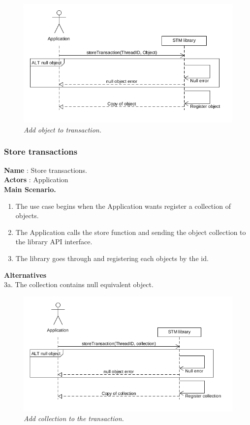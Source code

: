 \documentclass[12pt]{article}
\begin{document}
{\begin{figure}[h!]
\centering
\includegraphics[scale=0.5]{Pictures/store.png}
\caption{\textit{\color{gray}Add object to transaction.}}
\end{figure}

\subsubsection{Store transactions}
\textbf{Name} : Store transactions.\\
\textbf{Actors} : Application\\
\textbf{Main Scenario.}
\begin{enumerate}
  \item The use case begins when the Application wants register a collection of objects.
 \item The Application calls the store function and sending the object collection to the library API interface.
  \item The library goes  through and registering each objects by the id.
\end{enumerate}
\textbf{Alternatives}\\
3a. The collection contains null equivalent object.\\

\begin{figure}[h!]
\centering
\includegraphics[scale=0.5]{Pictures/storeTransactions.png}
\caption{\textit{\color{gray}Add collection to the transaction.}}
\end{figure}

}
\end{document}
